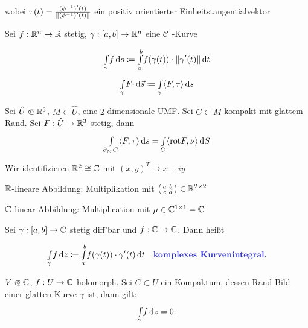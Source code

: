 \documentclass{cheat-sheet}
\newcommand{\rot}{\mathrm{rot}} %
\theoremstyle{definition}
\begin{document}
wobei $\tau(t) = \tfrac{(\phi^{-1})'(t)}{\lVert(\phi^{-1})'(t)\rVert}$ ein positiv orientierter Einheitstangentialvektor

\begin{defn}
  Sei $f : \mathbb{R}^n \to \mathbb{R}$ stetig, $\gamma : \left[ a, b \right] \to \mathbb{R}^n$ eine $\mathcal{C}^1$-Kurve

  \[ {\textstyle \int\limits_{\gamma}^{}} f \,\mathrm{d} s \coloneqq {\textstyle \int\limits_{a}^{b}} f(\gamma(t)) \cdot \lVert\gamma'(t)\rVert \,\mathrm{d} t \]
  \[ {\textstyle \int\limits_{\gamma}^{}} F {\cdot} \,\mathrm{d} \vec{s} \coloneqq {\textstyle \int\limits_{\gamma}^{}} \langle F , \tau \rangle \,\mathrm{d} s \]
\end{defn}

\begin{satz}
  Sei $\hat{U} \opn \R^3$, $M \subset \hat{U}$, eine $2$-dimensionale UMF. Sei $C \subset M$ kompakt mit glattem Rand. Sei $F : \hat{U} \to \mathbb{R}^3$ stetig, dann
  \[ \Int{\partial_M C}{}{\langle F, \tau \rangle}{s} = \Int{C}{}{\langle \rot F, \nu \rangle}{S} \]
\end{satz}


Wir identifizieren $\mathbb{R}^2 \cong \mathbb{C}$ mit $(x, y)^T \mapsto x + iy$

$\mathbb{R}$-lineare Abbildung: Multiplikation mit $\left( \begin{smallmatrix} a & b \\ c & d \end{smallmatrix} \right) \in \mathbb{R}^{2 \times 2}$

$\mathbb{C}$-linear Abbildung: Multiplication mit $\mu \in \mathbb{C}^{1 \times 1} = \mathbb{C}$


\begin{defn}
  Sei $\gamma : \left[ a, b \right] \to \mathbb{C}$ stetig diff'bar und $f : \mathbb{C} \to \mathbb{C}$. Dann heißt

  \[
    \Int{\gamma}{}{f}{z} \coloneqq \Int{a}{b}{f(\gamma(t)) \cdot \gamma'(t)}{t}
    \quad \text{\emph{komplexes Kurvenintegral}.}
  \]
\end{defn}

\begin{satz}
  $V \opn \C$, $f : U \to \mathbb{C}$ holomorph. Sei $C \subset U$ ein Kompaktum, dessen Rand Bild einer glatten Kurve $\gamma$ ist, dann gilt:
  \[ {\textstyle \int\limits_{\gamma}^{}} f \,\mathrm{d} z = 0. \]
\end{satz}
\end{document}
